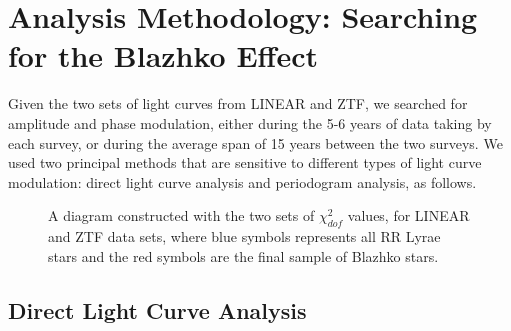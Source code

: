 \section{Analysis Methodology: Searching for the Blazhko Effect  \label{sec:analysis}}  

Given the two sets of light curves from LINEAR and ZTF, we searched for amplitude and phase modulation,
either during the 5-6 years of data taking by each survey, or during the average span of 15 years between the two
surveys. We used two principal methods that are sensitive to different types of light curve modulation: direct light
curve analysis and periodogram analysis, as follows.

\begin{figure}
\caption{A diagram constructed with the two sets of $\chi^2_{dof}$ values, for LINEAR and ZTF data sets, where
         blue symbols represents all RR Lyrae stars and the red symbols are the final sample of Blazhko stars.}
\label{fig:chi2}
\end{figure}


 
\subsection{Direct Light Curve Analysis}


